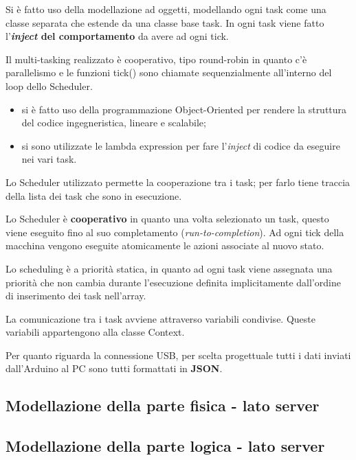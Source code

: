 Si è fatto uso della modellazione ad oggetti, modellando ogni task come una classe separata che estende da una classe base task. In ogni task viene fatto l'\textbf{\textit{inject} del comportamento} da avere ad ogni tick.

Il multi-tasking realizzato è cooperativo, tipo round-robin in quanto c'è parallelismo e le funzioni tick() sono chiamate sequenzialmente all'interno del loop dello Scheduler.

\begin{itemize}	
	\item si è fatto uso della programmazione Object-Oriented per rendere la struttura del codice ingegneristica, lineare e scalabile;
	\item si sono utilizzate le lambda expression per fare l'\textit{inject} di codice da eseguire nei vari task.
\end{itemize}

Lo Scheduler utilizzato permette la cooperazione tra i task; per farlo tiene traccia della lista dei task che sono in esecuzione.

Lo Scheduler è \textbf{cooperativo} in quanto una volta selezionato un task, questo viene eseguito fino al suo completamento (\textit{run-to-completion}). Ad ogni tick della macchina vengono eseguite atomicamente le azioni associate al nuovo stato.

Lo scheduling è a priorità statica, in quanto ad ogni task viene assegnata una priorità che non cambia durante l'esecuzione definita implicitamente dall'ordine di inserimento dei task nell'array.

La comunicazione tra i task avviene attraverso variabili condivise. Queste variabili appartengono alla classe Context.

Per quanto riguarda la connessione USB, per scelta progettuale tutti i dati inviati dall'Arduino al PC sono tutti formattati in \textbf{JSON}.

\subsection{Modellazione della parte fisica - lato server}
\subsection{Modellazione della parte logica - lato server}
